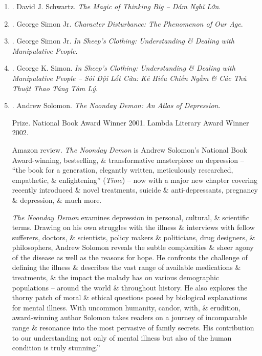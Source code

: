 \documentclass{article}
\begin{document}
\begin{enumerate}
	\item \cite{Schwartz2019}. David J. Schwartz. {\it The Magic of Thinking Big -- Dám Nghĩ Lớn}.\hfill{\sf[done]}
	
	\item \cite{Simon_character}. George Simon Jr. {\it Character Disturbance: The Phenomenon of Our Age}.\hfill{\sf[done]}
	
	\item \cite{Simon_sheep}. George Simon Jr. {\it In Sheep's Clothing: Understanding \& Dealing with Manipulative People}.\hfill{\sf[reading]}
	
	\item \cite{Simon_sheep_VN}. George K. Simon. {\it In Sheep's Clothing: Understanding \& Dealing with Manipulative People -- Sói Đội Lốt Cừu: Kẻ Hiếu Chiến Ngầm \& Các Thủ Thuật Thao Túng Tâm Lý}.\hfill{\sf[done]}
	
	\item \cite{Solomon_depression}. {\sc Andrew Solomon}. {\it The Noonday Demon: An Atlas of Depression}.\hfill{\sf[reading]}
	
	{\sf Prize.} National Book Award Winner 2001. Lambda Literary Award Winner 2002.
	
	{\sf Amazon review.} {\it The Noonday Demon} is {\sc Andrew Solomon}'s National Book Award-winning, bestselling, \& transformative masterpiece on depression -- ``the book for a generation, elegantly written, meticulously researched, empathetic, \& enlightening'' ({\it Time}) -- now with a major new chapter covering recently introduced \& novel treatments, suicide \& anti-depressants, pregnancy \& depression, \& much more.
	
	{\it The Noonday Demon} examines depression in personal, cultural, \& scientific terms. Drawing on his own struggles with the illness \& interviews with fellow sufferers, doctors, \& scientists, policy makers \& politicians, drug designers, \& philosophers, {\sc Andrew Solomon} reveals the subtle complexities \& sheer agony of the disease as well as the reasons for hope. He confronts the challenge of defining the illness \& describes the vast range of available medications \& treatments, \& the impact the malady has on various demographic populations -- around the world \& throughout history. He also explores the thorny patch of moral \& ethical questions posed by biological explanations for mental illness. With uncommon humanity, candor, with, \& erudition, award-winning author {\sc Solomon} takes readers on a journey of incomparable range \& resonance into the most pervasive of family secrets. His contribution to our understanding not only of mental illness but also of the human condition is truly stunning.''
	

\end{enumerate}
\end{document}
